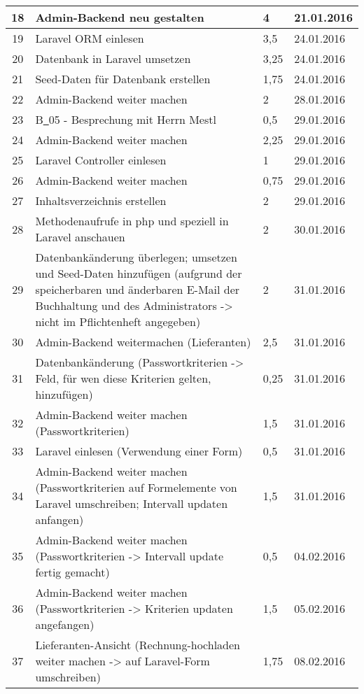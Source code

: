 \begin{longtable}[h]{| c | p{11.6cm} | l | l |}
18 & Admin-Backend neu gestalten & 4 & 21.01.2016 \\ \hline
19 & Laravel ORM einlesen & 3,5 & 24.01.2016 \\ \hline
20 & Datenbank in Laravel umsetzen & 3,25 & 24.01.2016 \\ \hline
21 & Seed-Daten für Datenbank erstellen & 1,75 & 24.01.2016 \\ \hline
22 & Admin-Backend weiter machen & 2 & 28.01.2016 \\ \hline
23 & B\underline{\ }05 - Besprechung mit Herrn Mestl & 0,5 & 29.01.2016 \\ \hline
24 & Admin-Backend weiter machen & 2,25 & 29.01.2016 \\ \hline
25 & Laravel Controller einlesen & 1 & 29.01.2016 \\ \hline
26 & Admin-Backend weiter machen & 0,75 & 29.01.2016 \\ \hline
27 & Inhaltsverzeichnis erstellen & 2 & 29.01.2016 \\ \hline
28 & Methodenaufrufe in php und speziell in Laravel anschauen & 2 & 30.01.2016 \\ \hline
29 & Datenbankänderung überlegen; umsetzen und Seed-Daten hinzufügen (aufgrund der speicherbaren und änderbaren E-Mail der Buchhaltung und des Administrators -> nicht im Pflichtenheft angegeben) & 2 & 31.01.2016 \\ \hline
30 & Admin-Backend weitermachen (Lieferanten) & 2,5 & 31.01.2016 \\ \hline
31 & Datenbankänderung (Passwortkriterien -> Feld, für wen diese Kriterien gelten, hinzufügen) & 0,25 & 31.01.2016 \\ \hline
32 & Admin-Backend weiter machen (Passwortkriterien) & 1,5 & 31.01.2016 \\ \hline
33 & Laravel einlesen (Verwendung einer Form) & 0,5 & 31.01.2016 \\ \hline
34 & Admin-Backend weiter machen (Passwortkriterien auf Formelemente von Laravel umschreiben; Intervall updaten anfangen) & 1,5 & 31.01.2016 \\ \hline
35 & Admin-Backend weiter machen (Passwortkriterien -> Intervall update fertig gemacht) & 0,5 & 04.02.2016 \\ \hline
36 & Admin-Backend weiter machen (Passwortkriterien -> Kriterien updaten angefangen) & 1,5 & 05.02.2016 \\ \hline
37 & Lieferanten-Ansicht (Rechnung-hochladen weiter machen -> auf Laravel-Form umschreiben) & 1,75 & 08.02.2016 \\ \hline

\end{longtable}
